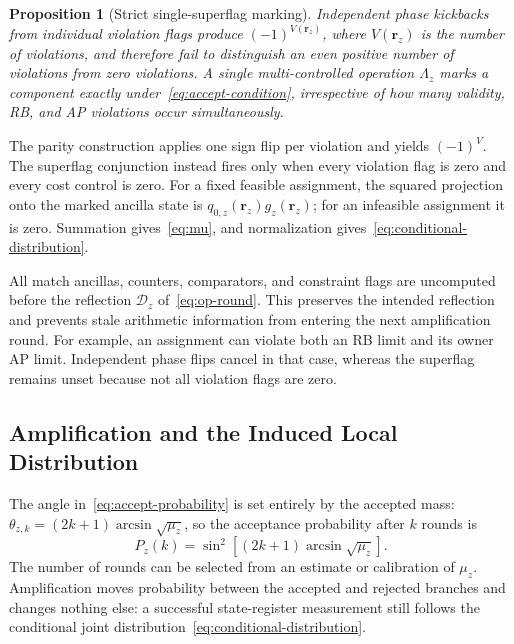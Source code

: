 \documentclass[journal]{IEEEtran}
\newtheorem{proposition}{Proposition}
\newcommand{\calD}{\mathcal{D}}  %
\begin{document}
\begin{proposition}[Strict single-superflag marking]
\label{prop:superflag}
Independent phase kickbacks from individual violation flags produce $(-1)^{V(\bm r_z)}$, where $V(\bm r_z)$ is the number of violations, and therefore fail to distinguish an even positive number of violations from zero violations. A single multi-controlled operation $\Lambda_z$ marks a component exactly under~\eqref{eq:accept-condition}, irrespective of how many validity, RB, and AP violations occur simultaneously.
\end{proposition}
\begin{IEEEproof}
The parity construction applies one sign flip per violation and yields $(-1)^V$. The superflag conjunction instead fires only when every violation flag is zero and every cost control is zero. For a fixed feasible assignment, the squared projection onto the marked ancilla state is $q_{0,z}(\bm r_z)g_z(\bm r_z)$; for an infeasible assignment it is zero. Summation gives~\eqref{eq:mu}, and normalization gives~\eqref{eq:conditional-distribution}.
\end{IEEEproof}

All match ancillas, counters, comparators, and constraint flags are uncomputed before the reflection $\calD_z$ of~\eqref{eq:op-round}. This preserves the intended reflection and prevents stale arithmetic information from entering the next amplification round. For example, an assignment can violate both an RB limit and its owner AP limit. Independent phase flips cancel in that case, whereas the superflag remains unset because not all violation flags are zero.

\subsection{Amplification and the Induced Local Distribution}
\label{sec:distribution}

The angle in~\eqref{eq:accept-probability} is set entirely by the accepted mass: $\theta_{z,k}=(2k+1)\arcsin\sqrt{\mu_z}$, so the acceptance probability after $k$ rounds is
\begin{equation}
\label{eq:success}
P_z(k)=
\sin^2\!\left[(2k+1)\arcsin\sqrt{\mu_z}\right].
\end{equation}
The number of rounds can be selected from an estimate or calibration of $\mu_z$. Amplification moves probability between the accepted and rejected branches and changes nothing else: a successful state-register measurement still follows the conditional joint distribution~\eqref{eq:conditional-distribution}.
\end{document}
